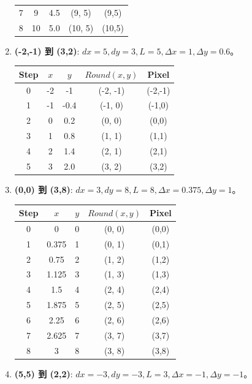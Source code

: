 \documentclass[UTF8]{ctexart}
\begin{document}
\begin{enumerate}
\begin{center}
\begin{tabular}{ccccc}
    7 & 9 & 4.5 & (9, 5) & (9,5) \\ 8 & 10 & 5.0 & (10, 5) & (10,5) \\ \bottomrule
    \end{tabular}
    \end{center}
    \item \textbf{(-2,-1) 到 (3,2)}: $dx=5, dy=3, L=5, \Delta x=1, \Delta y=0.6$。
    \begin{center}
    \begin{tabular}{ccccc}
    \toprule Step & $x$ & $y$ & $Round(x,y)$ & Pixel \\ \midrule
    0 & -2 & -1 & (-2, -1) & (-2,-1) \\
    1 & -1 & -0.4 & (-1, 0) & (-1,0) \\ 2 & 0 & 0.2 & (0, 0) & (0,0) \\
    3 & 1 & 0.8 & (1, 1) & (1,1) \\ 4 & 2 & 1.4 & (2, 1) & (2,1) \\
    5 & 3 & 2.0 & (3, 2) & (3,2) \\ \bottomrule
    \end{tabular}
    \end{center}
    \item \textbf{(0,0) 到 (3,8)}: $dx=3, dy=8, L=8, \Delta x=0.375, \Delta y=1$。
    \begin{center}
    \begin{tabular}{ccccc}
    \toprule Step & $x$ & $y$ & $Round(x,y)$ & Pixel \\ \midrule
    0 & 0 & 0 & (0, 0) & (0,0) \\
    1 & 0.375 & 1 & (0, 1) & (0,1) \\ 2 & 0.75 & 2 & (1, 2) & (1,2) \\
    3 & 1.125 & 3 & (1, 3) & (1,3) \\ 4 & 1.5 & 4 & (2, 4) & (2,4) \\
    5 & 1.875 & 5 & (2, 5) & (2,5) \\ 6 & 2.25 & 6 & (2, 6) & (2,6) \\
    7 & 2.625 & 7 & (3, 7) & (3,7) \\ 8 & 3 & 8 & (3, 8) & (3,8) \\ \bottomrule
    \end{tabular}
    \end{center}
    \item \textbf{(5,5) 到 (2,2)}: $dx=-3, dy=-3, L=3, \Delta x=-1, \Delta y=-1$。
    \begin{center}
    \begin{tabular}{ccccc}

\end{tabular}
\end{center}
\end{enumerate}
\end{document}
